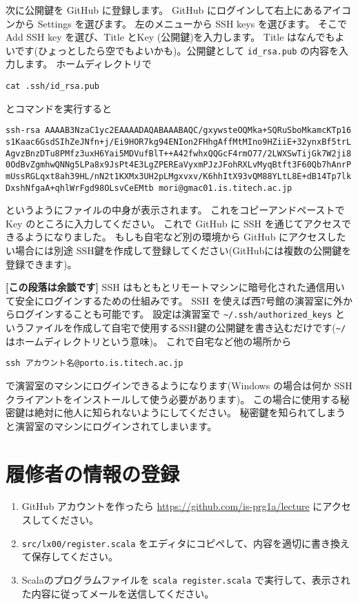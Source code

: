 \documentclass[a4paper]{article}
\begin{document}
次に公開鍵を GitHub に登録します。
GitHub にログインして右上にあるアイコンから Settings を選びます。
左のメニューから SSH keys を選びます。
そこで Add SSH key を選び、Title  とKey (公開鍵)を入力します。
Title はなんでもよいです(ひょっとしたら空でもよいかも)。公開鍵として \texttt{id\_rsa.pub} の内容を入力します。
ホームディレクトリで
\begin{verbatim}
cat .ssh/id_rsa.pub
\end{verbatim}
とコマンドを実行すると
\begin{verbatim}
ssh-rsa AAAAB3NzaC1yc2EAAAADAQABAAABAQC/gxywsteOQMka+SQRuSboMkamcKTp16
s1Kaac6GsdSIhZeJNfn+j/Ei9HOR7kg94ENIon2FHhgAffMtMIno9HZiiE+32ynxBf5trL
AgvzBnzDTu8PMfz3uxH6Yai5MDVufBlT++A42fwhxQQGcF4rmO77/2LWXSwTijGk7W2ji8
0OdBvZgmhwQNNg5LPa8x9JsPt4E3LgZPEREaVyxmPJzJFohRXLvMyqBtft3F60Qb7hAnrP
mUssRGLqxt8ah39HL/nN2t1KXMx3UH2pLMgxvxv/K6hhItX93vQM88YLtL8E+dB14Tp7lk
DxshNfgaA+qhlWrFgd98OLsvCeEMtb mori@gmac01.is.titech.ac.jp
\end{verbatim}
というようにファイルの中身が表示されます。
これをコピーアンドペーストで Key のところに入力してください。
%
これで GitHub に SSH を通じてアクセスできるようになりました。
もしも自宅など別の環境から GitHub にアクセスしたい場合には別途 SSH鍵を作成して登録してください(GitHubには複数の公開鍵を登録できます)。

\textbf{[この段落は余談です]} SSH はもともとリモートマシンに暗号化された通信用いて安全にログインするための仕組みです。
SSH を使えば西7号館の演習室に外からログインすることも可能です。
設定は演習室で \texttt{\~{}/.ssh/authorized\_keys} というファイルを作成して自宅で使用するSSH鍵の公開鍵を書き込むだけです(\texttt{\~{}/}はホームディレクトリという意味)。
これで自宅など他の場所から
\begin{verbatim}
ssh アカウント名@porto.is.titech.ac.jp
\end{verbatim}
で演習室のマシンにログインできるようになります(Windows の場合は何か SSH クライアントをインストールして使う必要があります)。
この場合に使用する秘密鍵は絶対に他人に知られないようにしてください。
秘密鍵を知られてしまうと演習室のマシンにログインされてしまいます。


\section{履修者の情報の登録}
\begin{enumerate}
\item GitHub アカウントを作ったら \url{https://github.com/is-prg1a/lecture} にアクセスしてください。
\item \texttt{src/lx00/register.scala} をエディタにコピペして、内容を適切に書き換えて保存してください。
\item Scalaのプログラムファイルを \texttt{scala register.scala} で実行して、表示された内容に従ってメールを送信してください。
\end{enumerate}
\end{document}
